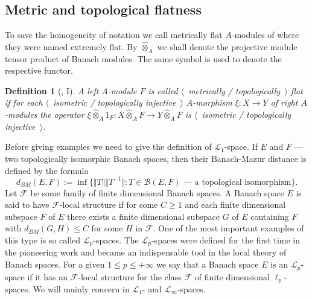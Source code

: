 \documentclass[12pt]{article}
\newcommand{\projmodtens}[1]{\mathbin{\widehat{\otimes}}_{#1}}
\newtheorem{definition}[theorem]{Definition}
\begin{document}

\subsection{Metric and topological flatness}
\label{SubSectionMetricAndTopologicalFlatness}

To save the homogeneity of notation we call metrically flat $A$-modules of \cite{HelMetrFlatNorMod} where they were named extremely flat. By $\projmodtens{A}$ we shall denote the projective module tensor product of Banach modules. The same symbol is used to denote the respective functor.

\begin{definition}[\cite{HelMetrFlatNorMod}, I]\label{MetTopFlatMod} A left $A$-module $F$ is called $\langle$~metrically / topologically~$\rangle$ flat if for each $\langle$~isometric / topologically injective~$\rangle$ $A$-morphism $\xi:X\to Y$ of right $A$-modules the operator $\xi\projmodtens{A} 1_F:X\projmodtens{A} F\to Y\projmodtens{A} F$ is $\langle$~isometric / topologically injective~$\rangle$.
\end{definition}

Before giving examples we need to give the definition of $\mathscr{L}_1$-space. If $E$ and $F$ --- two topologically isomorphic Banach spaces, then their Banach-Mazur distance is defined by the formula 
$$
d_{BM}(E,F):=\inf\{\Vert T\Vert\Vert T^{-1}\Vert: T \in \mathcal{B}(E,F) \mbox{ --- a topological isomorphism}\}.
$$ 
Let $\mathcal{F}$ be some family of finite dimensional Banach spaces. A Banach space $E$ is said to have $\mathcal{F}$-local structure if for some $C\geq 1$ and each finite dimensional subspace $F$ of $E$ there exists a finite dimensional subspace $G$ of $E$ containing $F$ with $d_{BM}(G,H)\leq C$ for some $H$ in $\mathcal{F}$. One of the most important examples of this type is so called $\mathscr{L}_p$-spaces. The $\mathscr{L}_p$-spaces were defined for the first time in the pioneering work \cite{LinPelAbsSumOpInLpSpAndApp} and became an indispensable tool in the local theory of Banach spaces. For a given $1\leq p\leq +\infty$ we say that a Banach space $E$ is an $\mathscr{L}_{p}$-space if it has an $\mathcal{F}$-local structure for the class $\mathcal{F}$ of finite dimensional $\ell_p$-spaces. We will mainly concern in $\mathscr{L}_1$- and $\mathscr{L}_\infty$-spaces. 
\end{document}
